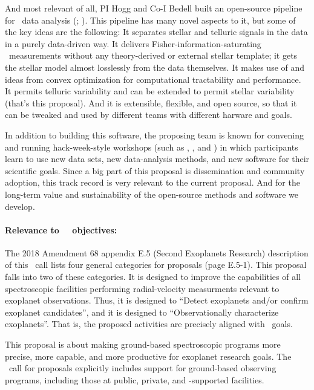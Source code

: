 \documentclass[12pt, letterpaper]{article}
\begin{document}
And most relevant of all, PI Hogg and Co-I Bedell built an open-source
pipeline for \EPRV\ data analysis (\wobble; \citealt{Bedell2019}).
This pipeline has many novel aspects to it, but some of the key ideas
are the following: 
It separates stellar and telluric signals in the data in a purely
data-driven way.
It delivers Fisher-information-saturating \RV\ measurements without any
theory-derived or external stellar template; it gets the stellar model
almost losslessly from the data themselves.
It makes use of  and ideas from convex optimization
for computational tractability and performance.
It permits telluric variability and can be extended to permit stellar
variability (that's this proposal).
And it is extensible, flexible, and open source, so that it can be
tweaked and used by different teams with different harware and goals.

In addition to building this software, the proposing team is known for
convening and running hack-week-style workshops (such as , , and ) in which participants learn to use new data sets, new
data-analysis methods, and new software for their scientific goals.
Since a big part of this proposal is dissemination and community adoption,
this track record is very relevant to the current proposal.
And for the long-term value and sustainability of the open-source methods
and software we develop.

\paragraph{Relevance to \NASA\ \XRP\ objectives:} The 2018 
Amendment 68 appendix E.5 (Second Exoplanets Research) description of this
\XRP\ call lists four general categories for proposals (page
E.5-1).
This proposal falls into two of these categories.
It is designed to improve the capabilities of all spectroscopic
facilities performing radial-velocity measurments relevant to
exoplanet observations.
Thus, it is designed to ``Detect exoplanets and/or confirm exoplanet
candidates'', and it is designed to ``Observationally characterize
exoplanets''.
That is, the proposed activities are precisely aligned with
\XRP\ goals.

This proposal is about making ground-based spectroscopic programs more
precise, more capable, and more productive for exoplanet research
goals.
The \XRP\ call for proposals explicitly includes support for
ground-based observing programs, including those at public, private,
and \NASA-supported facilities.
\end{document}

